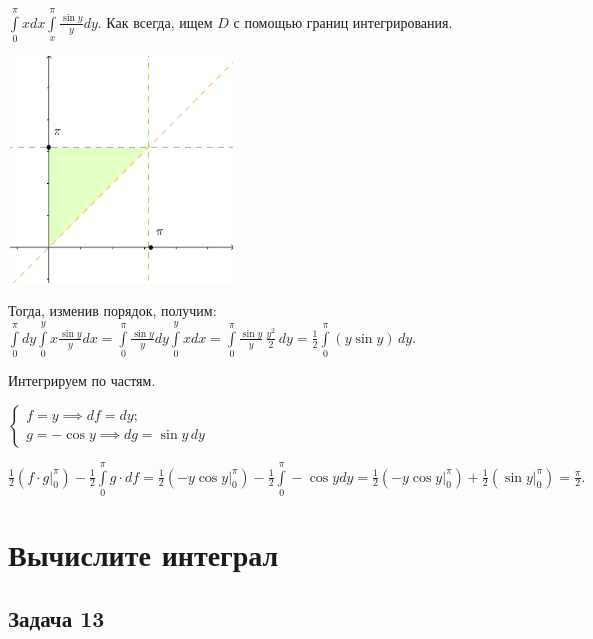 \documentclass[a4paper, fleqn]{article}
\begin{document}
    $\int\limits_{0}^{\pi} x dx \int\limits_{x}^{\pi} \frac{\sin y}{y} dy.$ Как всегда, ищем $D$ с помощью границ интегрирования.
    
    
    \includegraphics[width=6cm, height=6cm]{task_11.png}
    
    Тогда, изменив порядок, получим: $\int\limits_{0}^{\pi} dy \int\limits_{0}^{y} x \frac{\sin y}{y} dx = \int\limits_{0}^{\pi} \frac{\sin y}{y} dy \int\limits_{0}^{y} x  dx = \int\limits_{0}^{\pi} \frac{\sin y}{y}  \, \frac{y^2}{2} \, dy = \frac{1}{2} \int\limits_{0}^{\pi} (y \sin y) \, dy.$
    
    Интегрируем по частям.
    
        
    $\begin{cases}
    f = y \implies df = dy;\\
    g = -\cos y \implies dg = \sin y\, dy
    \end{cases}$
    
    $\frac{1}{2} \left(f \cdot g \Bigg|_{0}^{\pi} \right) - \frac{1}{2} \int\limits_{0}^{\pi} g \cdot df  =
    \frac{1}{2} \left(-y \cos y \Bigg|_{0}^{\pi} \right) - \frac{1}{2} \int\limits_{0}^{\pi} - \cos y dy = 
    \frac{1}{2} \left(-y \cos y \Bigg|_{0}^{\pi} \right) + \frac{1}{2}  \left(\sin y \Bigg|_{0}^{\pi} \right) = \frac{\pi}{2}.$
    
    
    \section*{Вычислите интеграл}
    
    \subsection*{Задача 13}
    
\end{document}
